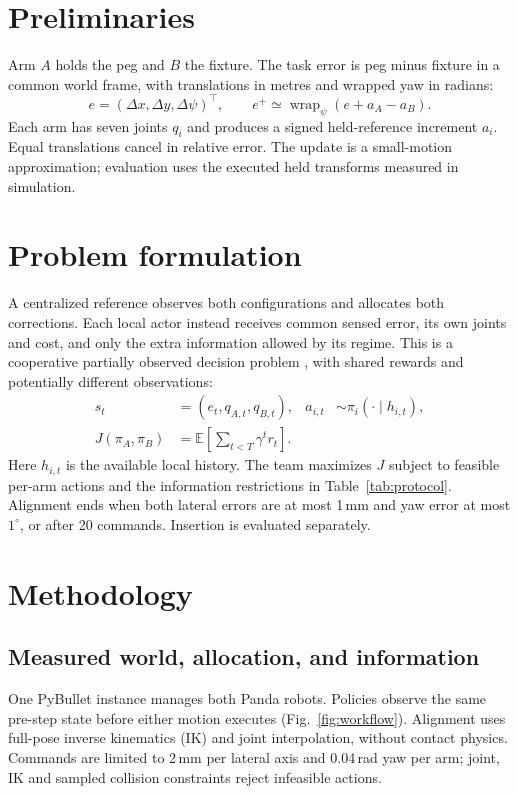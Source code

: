 \documentclass{article}
\begin{document}
\section{Preliminaries}
Arm $A$ holds the peg and $B$ the fixture. The task error is peg minus fixture in a common world frame, with translations in metres and wrapped yaw in radians:
\begin{equation*}
 e=(\Delta x,\Delta y,\Delta\psi)^\top,
 \qquad e^+\simeq\operatorname{wrap}_\psi(e+a_A-a_B).
\end{equation*}
Each arm has seven joints $q_i$ and produces a signed held-reference increment $a_i$. Equal translations cancel in relative error. The update is a small-motion approximation; evaluation uses the executed held transforms measured in simulation.

\section{Problem formulation}
A centralized reference observes both configurations and allocates both corrections. Each local actor instead receives common sensed error, its own joints and cost, and only the extra information allowed by its regime. This is a cooperative partially observed decision problem \cite{bernstein}, with shared rewards and potentially different observations:
\begin{align*}
 s_t&=(e_t,q_{A,t},q_{B,t}), & a_{i,t}&\sim\pi_i(\cdot\mid h_{i,t}),\\
 J(\pi_A,\pi_B)&=\mathbb E\!\left[\sum_{t<T}\gamma^t r_t\right].
\end{align*}
Here $h_{i,t}$ is the available local history. The team maximizes $J$ subject to feasible per-arm actions and the information restrictions in Table~\ref{tab:protocol}. Alignment ends when both lateral errors are at most 1\,mm and yaw error at most $1^\circ$, or after 20 commands. Insertion is evaluated separately.

\clearpage
\section{Methodology}
\subsection{Measured world, allocation, and information}
One PyBullet instance manages both Panda robots. Policies observe the same pre-step state before either motion executes (Fig.~\ref{fig:workflow}). Alignment uses full-pose inverse kinematics (IK) and joint interpolation, without contact physics. Commands are limited to 2\,mm per lateral axis and 0.04\,rad yaw per arm; joint, IK and sampled collision constraints reject infeasible actions.
\end{document}
